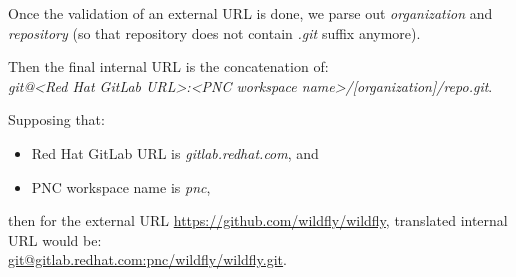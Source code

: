 \documentclass[../main.tex]{subfiles}
\begin{document}
Once the validation of an external URL is done, we parse out \textit{organization} and \textit{repository} (so that repository does not contain \textit{.git} suffix anymore).

Then the final internal URL is the concatenation of:\\
\textit{git@<Red Hat GitLab URL>:<PNC workspace name>/[organization]/repo.git}.

Supposing that:
\begin{itemize}
    \item Red Hat GitLab URL is \textit{gitlab.redhat.com}, and

    \item PNC workspace name is \textit{pnc},
\end{itemize}

then for the external URL \url{https://github.com/wildfly/wildfly}, translated internal URL would be:\\
\url{git@gitlab.redhat.com:pnc/wildfly/wildfly.git}.
\end{document}
